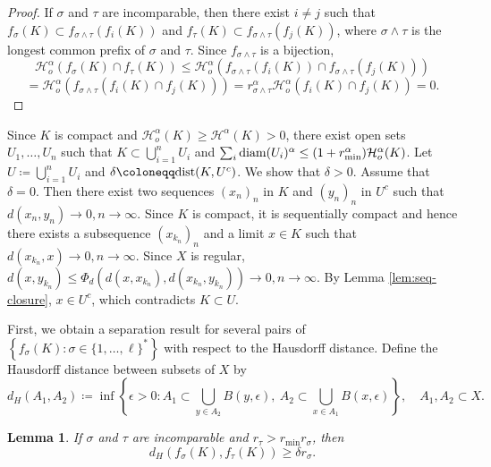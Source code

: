 \documentclass[a4paper, reqno, 11pt]{amsart}
\newtheorem{Lem}[Thm]{Lemma}
\theoremstyle{definition}
\begin{document}
\begin{proof}
If $\sigma$ and $\tau$ are incomparable, then there exist $i \ne j$ such that $f_{\sigma}(K) \subset f_{\sigma \wedge \tau} (f_i (K))$ and $f_{\tau}(K) \subset f_{\sigma \wedge \tau} (f_j (K))$, where $\sigma \wedge \tau$ is the longest common prefix of $\sigma$  and $\tau$. 
 Since $f_{\sigma \wedge \tau} $ is a bijection, 
 \[ \mathcal{H}^{\alpha}_{o} \left(f_{\sigma}(K) \cap f_{\tau}(K) \right) \le \mathcal{H}^{\alpha}_{o} \left(f_{\sigma \wedge \tau}(f_i(K)) \cap f_{\sigma \wedge \tau}(f_j(K)) \right) \]
 \[ =  \mathcal{H}^{\alpha}_{o} \left(f_{\sigma \wedge \tau}(f_i(K) \cap f_j(K)) \right) = r_{\sigma \wedge \tau}^{\alpha} \mathcal{H}^{\alpha}_{o}(f_{i}(K) \cap f_{j}(K))  = 0. \]
\end{proof}

Since $K$ is compact and $\mathcal{H}_o^{\alpha}(K) \ge \mathcal{H}^{\alpha}(K) > 0$, there exist open sets $U_1, \dots, U_n$ such that $K \subset \bigcup_{i=1}^{n} U_i$ and $\sum_{i} \textup{diam}(U_i)^{\alpha} \le (1+r_{\min}^{\alpha})\mathcal{H}_{o}^{\alpha}(K)$. 
Let $U \coloneqq  \bigcup_{i=1}^{n} U_i$ and $\delta \coloneqq \textup{dist}(K, U^c)$. 
We show that $\delta > 0$. 
Assume that $\delta = 0$. 
Then there exist two sequences $(x_n)_n$ in $K$ and $(y_n)_n$ in $U^c$ such that $d(x_n, y_n) \to 0, n \to \infty$. 
Since $K$ is compact, it is sequentially compact and hence there exists a subsequence $(x_{k_n})_n$ and a limit $x \in K$ such that $d(x_{k_n}, x) \to 0, n \to \infty$. 
Since $X$ is regular, $d(x, y_{k_n}) \le \Phi_d \left(d(x, x_{k_n}), d(x_{k_n}, y_{k_n})\right) \to 0, n \to \infty$. 
By Lemma \ref{lem:seq-closure}, $x \in U^c$, which contradicts $K \subset U$. 

First, we obtain a separation result for several pairs of $\left\{f_{\sigma}(K) \colon \sigma \in \{1, \dots, \ell\}^{*} \right\}$ with respect to the Hausdorff distance. 
Define the Hausdorff distance between subsets of $X$ by 
\[ d_H (A_1, A_2) \coloneqq \inf\left\{\epsilon > 0 \colon A_1 \subset \bigcup_{y \in A_2} B(y,\epsilon), \  A_2 \subset \bigcup_{x \in A_1} B(x,\epsilon) \right\}, \quad A_1, A_2 \subset X. \]

\begin{Lem}\label{lem:sep-dist-Haus}
 If $\sigma$ and $\tau$ are incomparable and $r_{\tau} > r_{\min} r_{\sigma}$, 
 then 
 \[ d_H (f_{\sigma}(K), f_{\tau}(K)) \ge \delta r_{\sigma}.\]  
\end{Lem}
\end{document}
